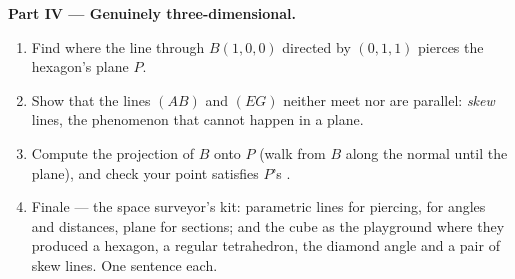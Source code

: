 \begin{problem}
\medskip
\noindent\textbf{Part IV --- Genuinely three-dimensional.}
\begin{enumerate}[resume]
  \item Find where the line through $B(1,0,0)$ directed by
        $(0,1,1)$ pierces the hexagon's plane $P$.
  \item Show that the lines $(AB)$ and $(EG)$ neither meet nor
        are parallel: \emph{skew} lines, the phenomenon that
        cannot happen in a plane.
  \item Compute the  projection of $B$ onto $P$
        (walk from $B$ along the normal until the plane), and
        check your point satisfies $P$'s .
  \item Finale --- the space surveyor's kit: parametric lines
        for piercing,  for angles and distances,
        plane  for sections; and the cube as the
        playground where they produced a hexagon, a regular
        tetrahedron, the diamond angle and a pair of skew
        lines. One sentence each.
\end{enumerate}
\end{problem}
